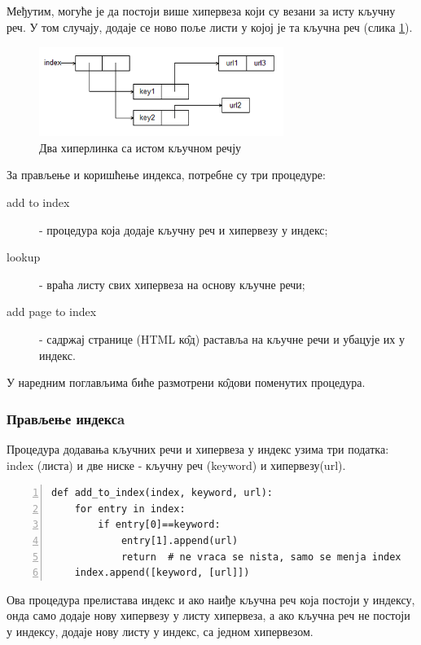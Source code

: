 Међутим, могуће је да постоји више хипервеза који су везани за исту кључну реч. У том случају, додаје се ново поље листи у којој је та кључна реч (слика \ref{slike:index3}).

\begin{figure}[here]
\centering
\includegraphics[height=110px, width=300px]{index3.png}
\caption{Два хиперлинка са истом кључном речју}
\label{slike:index3}
\end{figure}

За прављење и коришћење индекса, потребне су три процедуре:

\begin{description}
\item[add to index] - процедура која додаје кључну реч и хипервезу у индекс;
\item[lookup] - враћа листу свих хипервеза на основу кључне речи;
\item[add page to index] - садржај странице (HTML к\^{о}д) раставља на кључне речи и убацује их у индекс.
\end{description}

У наредним поглављима биће размотрени к\^{о}дови поменутих процедура.

\subsubsection{Прављење индексa}

Процедура додавања кључних речи и хипервеза у индекс узима три податка: index (листа) и две ниске - кључну реч (keyword) и хипервезу(url).

\begin{lstlisting}[caption=Процедура add\_to\_index, label={lst:addtoindex}, numbers=left]
def add_to_index(index, keyword, url):
    for entry in index:
        if entry[0]==keyword:
            entry[1].append(url)
            return  # ne vraca se nista, samo se menja index
    index.append([keyword, [url]])
\end{lstlisting}

Ова процедура прелистава индекс и ако наиђе кључна реч која постоји у индексу, онда само додаје нову хипервезу у листу хипервеза, а ако кључна реч не постоји у индексу, додаје нову листу у индекс, са једном хипервезом.

